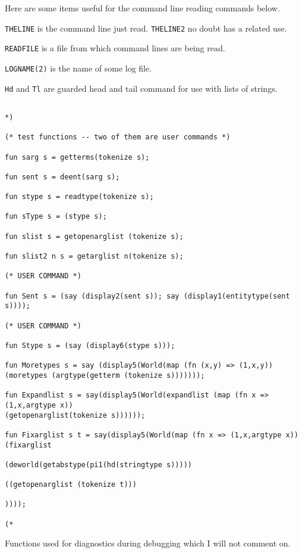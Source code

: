 \documentclass{article}
\begin{document}
Here are some items useful for the command line reading commands below.

{\tt THELINE} is the command line just read.  {\tt THELINE2} no doubt has a related use.

{\tt READFILE} is a file from which command lines are being read.

{\tt LOGNAME(2)} is the name of some log file.

{\tt Hd} and {\tt Tl} are guarded head and tail command for use with lists of strings.

\begin{verbatim}

*)

(* test functions -- two of them are user commands *)

fun sarg s = getterms(tokenize s);

fun sent s = deent(sarg s);

fun stype s = readtype(tokenize s);

fun sType s = (stype s);

fun slist s = getopenarglist (tokenize s);

fun slist2 n s = getarglist n(tokenize s);

(* USER COMMAND *)

fun Sent s = (say (display2(sent s)); say (display1(entitytype(sent s))));

(* USER COMMAND *)

fun Stype s = (say (display6(stype s)));

fun Moretypes s = say (display5(World(map (fn (x,y) => (1,x,y))
(moretypes (argtype(getterm (tokenize s)))))));

fun Expandlist s = say(display5(World(expandlist (map (fn x => (1,x,argtype x))
(getopenarglist(tokenize s))))));

fun Fixarglist s t = say(display5(World(map (fn x => (1,x,argtype x))(fixarglist

(deworld(getabstype(pi1(hd(stringtype s)))))

((getopenarglist (tokenize t)))

)))); 

(*

\end{verbatim}

Functions used for diagnostics during debugging which I will not comment on.
\end{document}
